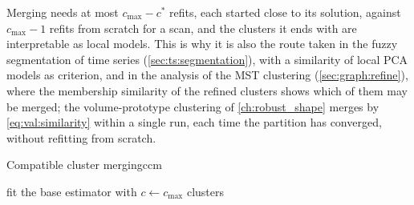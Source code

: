 Merging needs at most $c_{\max}-c^*$ refits, each started close to its solution, against $c_{\max}-1$ refits from scratch for a scan, and the clusters it ends with are interpretable as local models. This is why it is also the route taken in the fuzzy segmentation of time series (\cref{sec:ts:segmentation}), with a similarity of local PCA models as criterion, and in the analysis of the MST clustering (\cref{sec:graph:refine}), where the membership similarity of the refined clusters shows which of them may be merged; the volume-prototype clustering of \cref{ch:robust_shape} merges by \eqref{eq:val:similarity} within a single run, each time the partition has converged, without refitting from scratch.

\begin{algobox}{Compatible cluster merging}{ccm}
\begin{algorithm}[H]
fit the base estimator with $c\leftarrow c_{\max}$ clusters\;
\end{algorithm}
\end{algobox}

